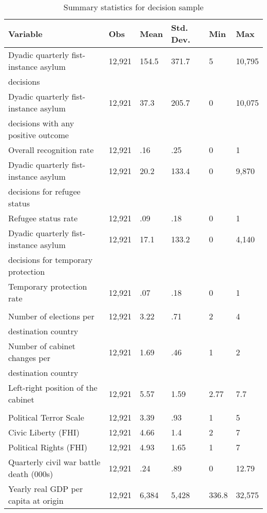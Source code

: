 \begin{table}[htbp]
	\centering
	\footnotesize
	\caption{Summary statistics for decision sample}
	\label{dec_summary_statistics}
\begin{tabularx}{\textwidth}{l YYYYY }\hline\hline
Variable & Obs & Mean & Std. Dev. & Min & Max  \\ \hline
Dyadic quarterly fist-instance asylum  & 12,921 & 154.5 & 371.7 & 5 & 10,795  \\
decisions  & & & &  &   \\
[0.6em]
Dyadic quarterly fist-instance asylum & 12,921 & 37.3 & 205.7 & 0 & 10,075  \\
decisions with any positive outcome & & & &  &   \\
[0.3em]
Overall recognition rate & 12,921 & .16 & .25 & 0 & 1  \\
[0.6em]
Dyadic quarterly fist-instance asylum  & 12,921 & 20.2 & 133.4 & 0 & 9,870  \\
decisions for refugee status & & & &  &   \\
[0.3em]
Refugee status rate & 12,921 & .09 & .18 & 0 & 1  \\
[0.6em]
Dyadic quarterly fist-instance asylum   & 12,921 & 17.1 & 133.2 & 0 & 4,140  \\
decisions for temporary protection& & & &  &   \\
[0.3em]
Temporary protection rate & 12,921 & .07 & .18 & 0 & 1  \\
[0.3em]
\\
Number of elections per  & 12,921 & 3.22 & .71 & 2 & 4  \\
destination country& & & &  &   \\
[0.3em]
Number of cabinet changes per & 12,921 & 1.69 & .46 & 1 & 2  \\
destination country& & & &  &   \\
[0.3em]
Left-right position of the cabinet & 12,921 & 5.57 & 1.59 & 2.77 & 7.7  \\
[0.3em]
\\
Political Terror Scale & 12,921 & 3.39 & .93 & 1 & 5  \\
[0.3em]
Civic Liberty (FHI) & 12,921 & 4.66 & 1.4 & 2 & 7  \\
[0.3em]
Political Rights (FHI) & 12,921 & 4.93 & 1.65 & 1 & 7  \\
[0.3em]
Quarterly civil war battle death (000s) & 12,921 & .24 & .89 & 0 & 12.79  \\
[0.3em]
Yearly real GDP per capita at origin & 12,921 & 6,384 & 5,428 & 336.8 & 32,575 \\

\end{tabularx}
\end{table}
